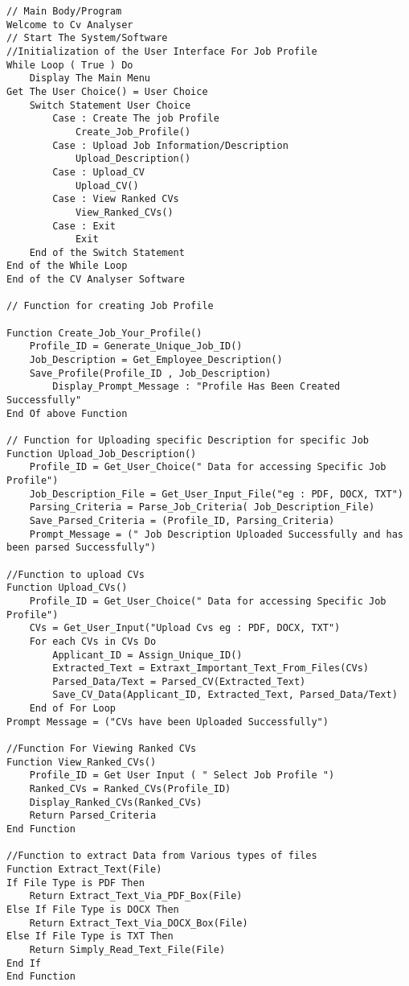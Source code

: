 \begin{lstlisting}[language=pseudocode, caption={Pseudocode for the CV Analyser}]
// Main Body/Program
Welcome to Cv Analyser 
// Start The System/Software
//Initialization of the User Interface For Job Profile
While Loop ( True ) Do
    Display The Main Menu
Get The User Choice() = User Choice
    Switch Statement User Choice 
        Case : Create The job Profile
            Create_Job_Profile()
        Case : Upload Job Information/Description
            Upload_Description()
        Case : Upload_CV
            Upload_CV()
        Case : View Ranked CVs
            View_Ranked_CVs()
        Case : Exit
            Exit
    End of the Switch Statement
End of the While Loop
End of the CV Analyser Software 

// Function for creating Job Profile 

Function Create_Job_Your_Profile()
    Profile_ID = Generate_Unique_Job_ID()
    Job_Description = Get_Employee_Description()
    Save_Profile(Profile_ID , Job_Description)
        Display_Prompt_Message : "Profile Has Been Created Successfully"
End Of above Function

// Function for Uploading specific Description for specific Job
Function Upload_Job_Description()
    Profile_ID = Get_User_Choice(" Data for accessing Specific Job Profile")
    Job_Description_File = Get_User_Input_File("eg : PDF, DOCX, TXT")
    Parsing_Criteria = Parse_Job_Criteria( Job_Description_File)
    Save_Parsed_Criteria = (Profile_ID, Parsing_Criteria)
    Prompt_Message = (" Job Description Uploaded Successfully and has been parsed Successfully")
    
//Function to upload CVs
Function Upload_CVs()
    Profile_ID = Get_User_Choice(" Data for accessing Specific Job Profile")
    CVs = Get_User_Input("Upload Cvs eg : PDF, DOCX, TXT")
    For each CVs in CVs Do
        Applicant_ID = Assign_Unique_ID()
        Extracted_Text = Extraxt_Important_Text_From_Files(CVs)
        Parsed_Data/Text = Parsed_CV(Extracted_Text) 
        Save_CV_Data(Applicant_ID, Extracted_Text, Parsed_Data/Text)
    End of For Loop
Prompt Message = ("CVs have been Uploaded Successfully")

//Function For Viewing Ranked CVs
Function View_Ranked_CVs()
    Profile_ID = Get User Input ( " Select Job Profile ")
    Ranked_CVs = Ranked_CVs(Profile_ID)
    Display_Ranked_CVs(Ranked_CVs)
    Return Parsed_Criteria
End Function

//Function to extract Data from Various types of files
Function Extract_Text(File)
If File Type is PDF Then
    Return Extract_Text_Via_PDF_Box(File)
Else If File Type is DOCX Then
    Return Extract_Text_Via_DOCX_Box(File)
Else If File Type is TXT Then 
    Return Simply_Read_Text_File(File)
End If
End Function


\end{lstlisting}
